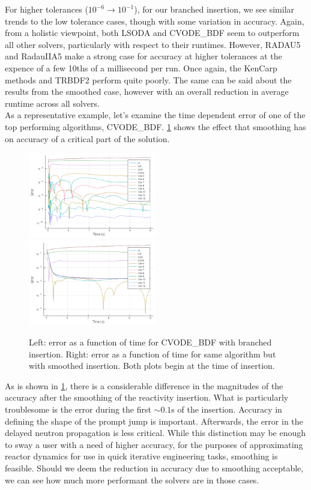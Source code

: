 \documentclass[review,onefignum,onetabnum]{siamart171218}
\begin{document}
For higher tolerances ($10^{-6} \rightarrow 10^{-1}$), for our branched insertion,
we see similar trends to the
low tolerance cases, though with some variation in accuracy. Again, from a holistic
viewpoint, both LSODA and CVODE\_BDF seem to outperform all other solvers, particularly with
respect to their runtimes. However, RADAU5 and RadauIIA5 make a strong case for accuracy at higher
tolerances at the expence of a few 10ths of a millisecond per run. Once again, the KenCarp methods
and TRBDF2 perform quite poorly. The same can be said about the results from the smoothed
case, however with an overall reduction in average runtime across all solvers. \\

As a representative example, let's examine the time dependent error of one of the top
performing algorithms, CVODE\_BDF. \cref{fig:timeseries-error} shows the effect
that smoothing has on accuracy of a critical part of the solution.\\

\begin{figure}[htb]
  \includegraphics[width=0.5\textwidth]{../plots/timeseries-error/CVODE_BDF.png}
  \includegraphics[width=0.5\textwidth]{../plots/timeseries-error/CVODE_BDF-tanh.png}
  \caption{Left: error as a function of time for CVODE\_BDF with branched insertion.
  Right: error as a function of time for same algorithm but with smoothed insertion. Both
  plots begin at the time of insertion.}
  \label{fig:timeseries-error}
\end{figure}

As is shown in \cref{fig:timeseries-error}, there is a considerable difference in
the magnitudes of the accuracy after the smoothing of the reactivity insertion.
What is particularly troublesome is the error during the first $\sim 0.1$s of the
insertion. Accuracy in defining the shape of the prompt jump is important. Afterwards,
the error in the delayed neutron propagation is less critical. While this distinction
may be enough to sway a user with a need of higher accuracy, for the purposes of
approximating reactor dynamics for use in quick iterative engineering tasks, smoothing
is feasible. Should we deem the reduction in accuracy due to smoothing acceptable,
we can see how much more performant the solvers are in those cases.\\
\end{document}
